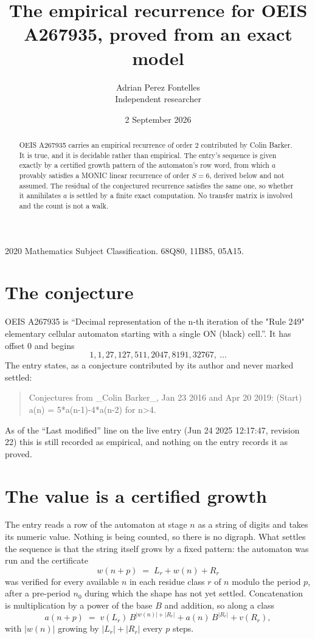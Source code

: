 \documentclass[11pt,a4paper]{article}
\title{The empirical recurrence for OEIS A267935, proved from an exact model}
\author{Adrian Perez Fontelles\\ \small Independent researcher}
\date{2 September 2026}
\theoremstyle{plain}
\theoremstyle{definition}
\begin{document}
\maketitle

\begin{abstract}
OEIS A267935 carries an empirical recurrence of order $2$ contributed by Colin Barker. It is true, and it is
decidable rather than empirical. The entry's sequence is given exactly by a certified growth pattern of the automaton's row word, from
which $a$ provably satisfies a MONIC linear recurrence of order $S=6$, derived below and not
assumed. The residual of the conjectured recurrence satisfies the same one, so whether it
annihilates $a$ is settled by a finite exact computation. No transfer matrix is involved and
the count is not a walk.
\end{abstract}

\noindent\small 2020 Mathematics Subject Classification. 68Q80, 11B85, 05A15.\normalsize

\section{The conjecture}

OEIS A267935 is ``Decimal representation of the n-th iteration of the "Rule 249" elementary cellular automaton starting with a single ON (black) cell.''. It has offset $0$ and begins
\[
1, 1, 27, 127, 511, 2047, 8191, 32767,\ \dots
\]
The entry states, as a conjecture contributed by its author and never marked settled:
\begin{quote}
Conjectures from \_Colin Barker\_, Jan 23 2016 and Apr 20 2019: (Start) a(n) = 5*a(n-1)-4*a(n-2) for n>4.
\end{quote}
As of the ``Last modified'' line on the live entry (Jun 24 2025 12:17:47, revision 22)
this is still recorded as empirical, and nothing on the entry records it as proved.

\section{The value is a certified growth}

The entry reads a row of the automaton at stage $n$ as a string of digits and takes its
numeric value. Nothing is being counted, so there is no digraph. What settles the sequence is
that the string itself grows by a fixed pattern: the automaton was run and the certificate
\[
w(n+p)\;=\;L_r + w(n) + R_r
\]
was verified for every available $n$ in each residue class $r$ of $n$ modulo the period $p$,
after a pre-period $n_0$ during which the shape has not yet settled. Concatenation is
multiplication by a power of the base $B$ and addition, so along a class
\[
a(n+p)\;=\;v(L_r)\,B^{|w(n)|+|R_r|} + a(n)\,B^{|R_r|} + v(R_r),
\]
with $|w(n)|$ growing by $|L_r|+|R_r|$ every $p$ steps.
\end{document}

